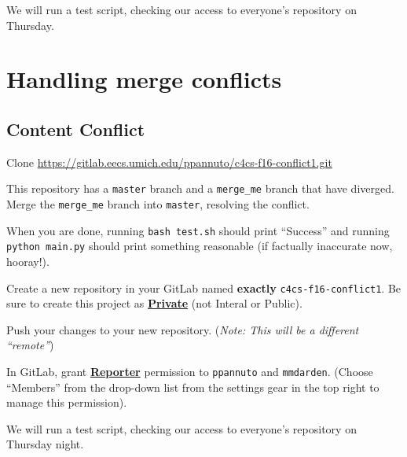 \documentclass{article}
\begin{document}
We will run a test script, checking our access to everyone's repository on
Thursday.


\newpage
\section{Handling merge conflicts}

\subsection{Content Conflict}

Clone \url{https://gitlab.eecs.umich.edu/ppannuto/c4cs-f16-conflict1.git}

This repository has a \texttt{master} branch and a \texttt{merge\_me} branch
that have diverged. Merge the \texttt{merge\_me} branch into \texttt{master},
resolving the conflict.

When you are done, running \texttt{bash test.sh} should print ``Success'' and
running \texttt{python main.py} should print something reasonable (if
factually inaccurate now, hooray!).

Create a new repository in your GitLab named \textbf{exactly}
\texttt{c4cs-f16-conflict1}.
Be sure to create this project as
\textbf{\ul{Private}} (not Interal or Public).

Push your changes to your new repository. (\emph{\small Note: This will be a
  different ``remote''})

In GitLab, grant \textbf{\ul{Reporter}} permission to \texttt{ppannuto} and
\texttt{mmdarden}.
(Choose ``Members'' from the drop-down list from the settings gear in the top
right to manage this permission).

We will run a test script, checking our access to everyone's repository on
Thursday night.
\end{document}
